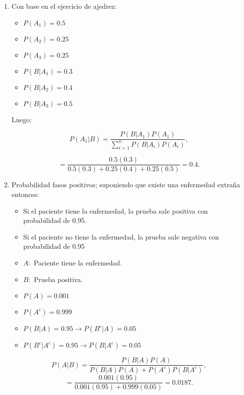 \documentclass[a4paper]{book}
\begin{document}
\begin{enumerate}[{Ej 1: }]
    \item Con base en el ejercicio de ajedrez:
        \begin{itemize}
           \item \(P\left(A_1\right)=0.5\)
           \item \(P\left(A_2\right)=0.25\)
           \item \(P\left(A_3\right)=0.25\)
        \end{itemize}

        \begin{itemize}
            \item \(P\left(B|A_1\right)=0.3\)
            \item \(P\left(B|A_2\right)=0.4\)
            \item \(P\left(B|A_3\right)=0.5\)
        \end{itemize}

        Luego:

        \[
            P\left(A_1|B\right) = \frac{P\left(B|A_1\right)P\left(A_1\right)}{\sum_{i=1}^{n} P\left(B|A_{i}\right)P\left(A_{i}\right)}
        ,\]

        \[
        = \frac{0.5\left(0.3\right)}{0.5\left(0.3\right)+0.25\left(0.4\right)+0.25\left(0.5\right)} = 0.4
        .\]

    \item Probabilidad fasos positivos; suponiendo que existe una enfermedad extraña entonces:
        \begin{itemize}
            \item Si el paciente tiene la enfermedad, la prueba sale positiva
                con probabilidad de 0.95.
            \item Si el paciente no tiene la enfermedad, la prueba sale
                negativa con probabilidad de 0.95
        \end{itemize}
        \begin{itemize}
            \item \(A:\) Paciente tiene la enfermedad.
            \item \(B:\) Prueba positiva.
        \end{itemize}
        \begin{itemize}
            \item \(P\left(A\right)=0.001\)
            \item \(P\left(A^{c}\right)=0.999\)
        \end{itemize}
        \begin{itemize}
            \item \(P\left(B|A\right)=0.95 \to P\left(B^{c}|A\right)=0.05\)
            \item \(P\left(B^{c}|A^{c}\right)=0.95\to P\left(B|A^{c}\right)=0.05\)
        \end{itemize}
        \[
        P\left(A|B\right)=\frac{P\left(B|A\right)P\left(A\right) }{P\left(B|A\right)P\left(A\right)+P\left(A^{c}\right)P\left(B|A^{c}\right)}
        ,\]
        \[
        =\frac{0.001\left(0.95\right)}{0.001\left(0.95\right)+0.999\left(0.05\right)}=0.0187
        .\]
\end{enumerate}
\end{document}
